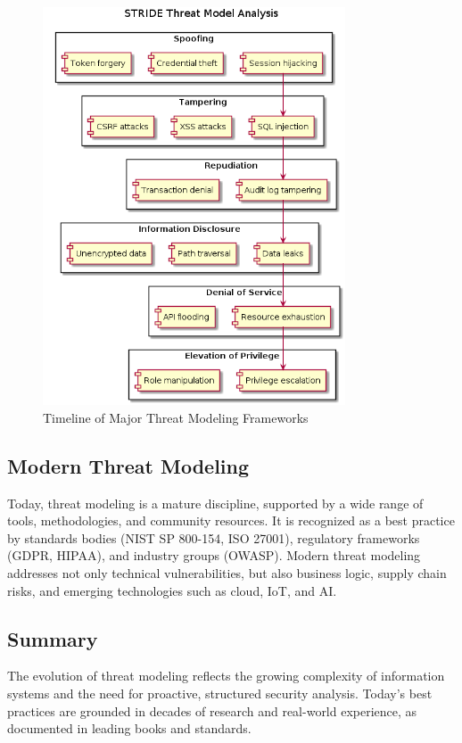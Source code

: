 \begin{figure}[H]
	\centering
	\includegraphics[width=0.8\textwidth]{images/stride-analysis}
	\caption{Timeline of Major Threat Modeling Frameworks}
\end{figure}

\subsection*{Modern Threat Modeling}
Today, threat modeling is a mature discipline, supported by a wide range of tools, methodologies, and community resources. It is recognized as a best practice by standards bodies (NIST SP 800-154\cite{nist800154}, ISO 27001), regulatory frameworks (GDPR, HIPAA), and industry groups (OWASP\cite{owasp}). Modern threat modeling addresses not only technical vulnerabilities, but also business logic, supply chain risks, and emerging technologies such as cloud, IoT, and AI.

\subsection*{Summary}
The evolution of threat modeling reflects the growing complexity of information systems and the need for proactive, structured security analysis. Today’s best practices are grounded in decades of research and real-world experience, as documented in leading books and standards\cite{shostack2014,uceda2015,owasp,nist800154,schneier1999}.
